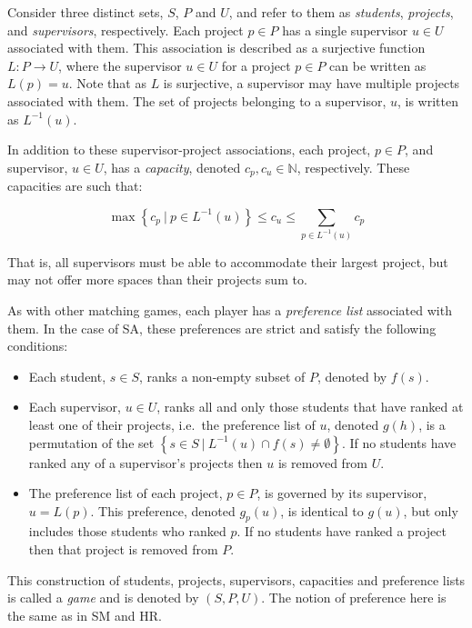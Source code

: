 \begin{definition}\label{def:sa_game}
    Consider three distinct sets, \(S\), \(P\) and \(U\), and refer to them as
    \emph{students}, \emph{projects}, and \emph{supervisors}, respectively. Each
    project \(p \in P\) has a single supervisor \(u \in U\) associated with
    them. This association is described as a surjective function \(L: P \to U\),
    where the supervisor \(u \in U\) for a project \(p \in P\) can be written as
    \(L(p) = u\). Note that as \(L\) is surjective, a supervisor may have
    multiple projects associated with them. The set of projects belonging to a
    supervisor, \(u\), is written as \(L^{-1}(u)\).

    In addition to these supervisor-project associations, each project, \(p \in
    P\), and supervisor, \(u \in U\), has a \emph{capacity}, denoted \(c_p, c_u
    \in \mathbb N\), respectively. These capacities are such that:

    \begin{equation}
        \max \left\{c_p \ | \ p \in L^{-1}(u)\right\}
        \le c_u
        \le \sum_{p \in L^{-1}(u)} c_p
    \end{equation}

    That is, all supervisors must be able to accommodate their largest project,
    but may not offer more spaces than their projects sum to.

    As with other matching games, each player has a \emph{preference list}
    associated with them. In the case of SA, these preferences are strict and
    satisfy the following conditions:

    \begin{itemize}
        \item Each student, \(s \in S\), ranks a non-empty subset of \(P\),
            denoted by \(f(s)\).
        \item Each supervisor, \(u \in U\), ranks all and only those students
            that have ranked at least one of their projects, i.e.\ the
            preference list of \(u\), denoted \(g(h)\), is a permutation of the
            set
            \(\left\{s \in S \ | \ L^{-1}(u) \cap f(s) \neq \emptyset\right\}\).
            If no students have ranked any of a supervisor's projects then \(u\)
            is removed from \(U\).
        \item The preference list of each project, \(p \in P\), is governed by
            its supervisor, \(u = L(p)\). This preference, denoted \(g_p (u)\),
            is identical to \(g(u)\), but only includes those students who
            ranked \(p\). If no students have ranked a project then that project
            is removed from \(P\).
    \end{itemize}

    This construction of students, projects, supervisors, capacities and
    preference lists is called a \emph{game} and is denoted by \((S, P, U)\).
    The notion of preference here is the same as in SM and HR.
\end{definition}

